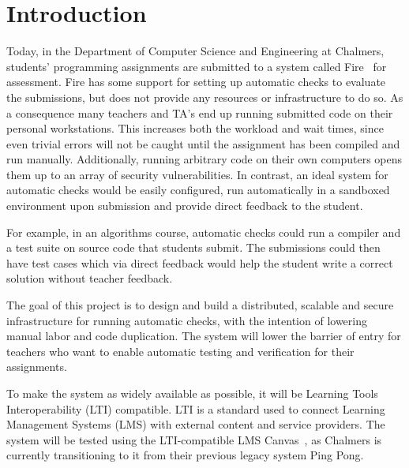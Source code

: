 \chapter{Introduction}

Today, in the Department of Computer Science and Engineering at Chalmers, students' programming assignments are submitted to a system called Fire~\cite{Fire:System} for assessment. Fire has some support for setting up automatic checks to evaluate the submissions, but does not provide any resources or infrastructure to do so. As a consequence many teachers and TA's end up running submitted code on their personal workstations. This increases both the workload and wait times, since even trivial errors will not be caught until the assignment has been compiled and run manually. Additionally, running arbitrary code on their own computers opens them up to an array of security vulnerabilities. In contrast, an ideal system for automatic checks would be easily configured, run automatically in a sandboxed environment upon submission and provide direct feedback to the student.

For example, in an algorithms course, automatic checks could run a compiler and a test suite on source code that students submit. The submissions could then have test cases which via direct feedback would help the student write a correct solution without teacher feedback.

The goal of this project is to design and build a distributed, scalable and secure infrastructure for running automatic checks, with the intention of lowering manual labor and code duplication. The system will lower the barrier of entry for teachers who want to enable automatic testing and verification for their assignments.

To make the system as widely available as possible, it will be Learning Tools Interoperability (LTI) compatible. LTI is a standard used to connect Learning Management Systems (LMS) with external content and service providers. The system will be tested using the LTI-compatible LMS Canvas~\cite{LearningInstructure}, as Chalmers is currently transitioning to it from their previous legacy system Ping Pong.
